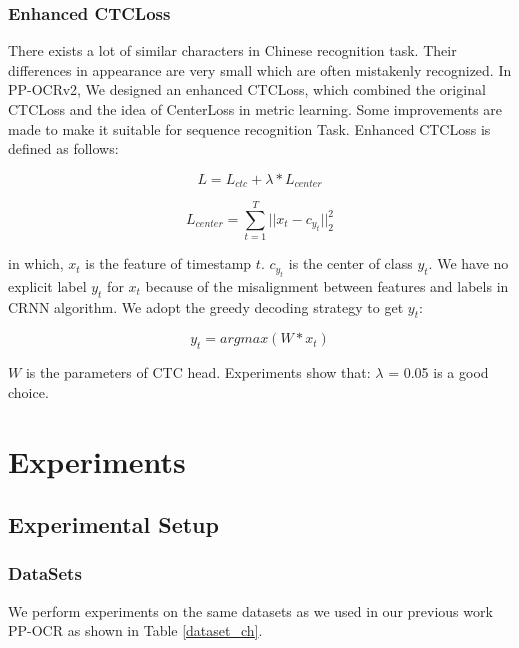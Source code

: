 \documentclass[letterpaper]{article} %
\begin{document}
\subsubsection{Enhanced CTCLoss}

There exists a lot of similar characters in Chinese recognition task. Their differences in appearance are very small which are often mistakenly recognized. In PP-OCRv2, We designed an enhanced CTCLoss, which combined the original CTCLoss and the idea of CenterLoss \cite{wen2016discriminative} in metric learning. Some improvements are made to make it suitable for sequence recognition Task. Enhanced CTCLoss is defined as follows: 
\begin{small}
\begin{equation}
          L = L_{ctc} + \lambda * L_{center}
\end{equation}
\end{small}
\begin{small}
\begin{equation}
L_{center} =\sum_{t=1}^T||x_{t} - c_{y_{t}}||_{2}^{2}
\end{equation}
\end{small}in which, $x_{t}$ is the feature of timestamp $t$. $c_{y_{t}}$ is the center of class $y_{t}$. We have no explicit label $y_{t}$ for $x_{t}$ because of the misalignment between features and labels in CRNN \cite{shi2016end} algorithm. We adopt the greedy decoding strategy to get $y_{t}$:
\begin{small}
\begin{equation}
          y_{t} = argmax(W * x_{t})
\end{equation}
\end{small}$W$ is the parameters of CTC head. Experiments show that: $\lambda$ = 0.05 is a good choice.


\section{Experiments}

\subsection{Experimental Setup}

\subsubsection{DataSets}
We perform experiments on the same datasets as we used in our previous work PP-OCR \cite{du2020pp} as shown in Table \ref{dataset_ch}. 
\end{document}
